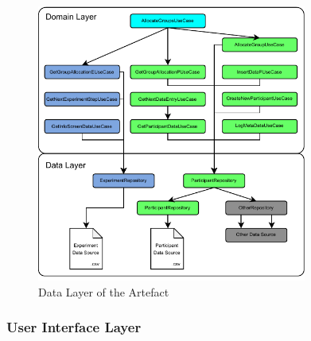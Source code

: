\begin{figure}[htbp]
    \centering
    \includegraphics[width=0.79\textwidth, keepaspectratio]{content/05_design_and_dev_artefacts/DomainLayer.drawio.pdf}
    \caption{Data Layer of the Artefact}    
    \label{fig:dataLayer}
\end{figure}



\subsubsection{User Interface Layer}

